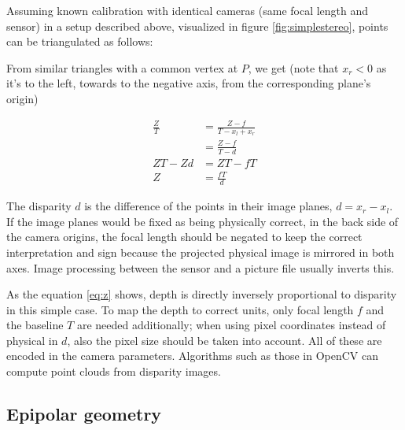 Assuming known calibration with identical cameras (same focal length and sensor) in a setup described above, visualized in figure \ref{fig:simplestereo}, points can be triangulated as follows:

From similar triangles with a common vertex at $P$, we get (note that $x_r < 0$ as it's to the left, towards to the negative axis, from the corresponding plane's origin)

\begin{align}
	\frac{Z}{T} &= \frac{Z-f}{T - x_l + x_r} \\
	&= \frac{Z-f}{T - d}\\
	ZT - Zd &= ZT - fT\\
	Z &= \frac{fT}{d} \label{eq:z}
\end{align}

The disparity $d$ is the difference of the points in their image planes, $d = x_r - x_l$.
If the image planes would be fixed as being physically correct, in the back side of the camera origins, the focal length should be negated to keep the correct interpretation and sign because the projected physical image is mirrored in both axes. Image processing between the sensor and a picture file usually inverts this.

As the equation \ref{eq:z} shows, depth is directly inversely proportional to disparity in this simple case.
To map the depth to correct units, only focal length $f$ and the baseline $T$ are needed additionally; when using pixel coordinates instead of physical in $d$, also the pixel size should be taken into account.
All of these are encoded in the camera parameters.
Algorithms such as those in OpenCV \cite{opencv} can compute point clouds from disparity images.


\subsection{Epipolar geometry} %

